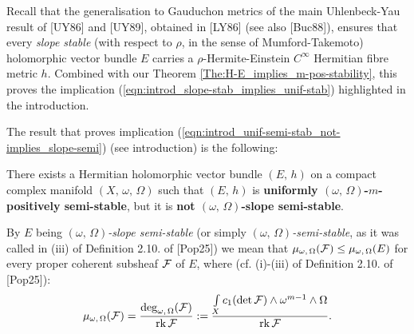 \documentclass[12pt]{article}
\begin{document}
Recall that the generalisation to Gauduchon metrics of the main Uhlenbeck-Yau result of [UY86] and [UY89], obtained in [LY86] (see also [Buc88]), ensures that every {\it slope stable} (with respect to $\rho$, in the sense of Mumford-Takemoto) holomorphic vector bundle $E$ carries a $\rho$-Hermite-Einstein $C^\infty$ Hermitian fibre metric $h$. Combined with our Theorem \ref{The:H-E_implies_m-pos-stability}, this proves the implication (\ref{eqn:introd_slope-stab_implies_unif-stab}) highlighted in the introduction. 




The result that proves implication (\ref{eqn:introd_unif-semi-stab_not-implies_slope-semi}) (see introduction) is the following:


\begin{The}\label{The:unif-semi-stab_not-slope-semi-stab} There exists a Hermitian holomorphic vector bundle $(E,\,h)$ on a compact complex manifold $(X,\,\omega,\,\Omega)$ such that $(E,\,h)$ is {\bf uniformly $(\omega,\,\Omega)$-$m$-positively semi-stable}, but it is {\bf not $(\omega,\,\Omega)$-slope semi-stable}. 


\end{The}

By $E$ being {\it $(\omega,\,\Omega)$-slope semi-stable} (or simply {\it $(\omega,\,\Omega)$-semi-stable}, as it was called in (iii) of Definition 2.10. of [Pop25]) we mean that $\mu_{\omega,\,\Omega}({\cal F})\leq\mu_{\omega,\,\Omega}(E)$ for every proper coherent subsheaf ${\cal F}$ of $E$, where (cf. (i)-(iii) of Definition 2.10. of [Pop25]): \begin{eqnarray*}\mu_{\omega,\,\Omega}({\cal F})=\frac{\deg_{\omega,\,\Omega}({\cal F})}{\operatorname{rk} {\cal F}}: = \frac{\int\limits_X c_1(\det {\cal F})\wedge\omega^{m-1}\wedge\Omega}{\operatorname{rk} {\cal F}}.\end{eqnarray*}
\end{document}
